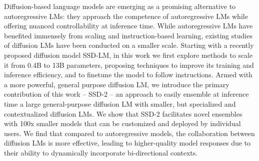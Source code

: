 Diffusion-based language models are emerging as a promising alternative to autoregressive LMs: they approach the competence of autoregressive LMs while offering nuanced controllability at inference time. While autoregressive LMs have benefited immensely from scaling and instruction-based learning, existing studies of diffusion LMs have been conducted on a smaller scale. Starting with a recently proposed diffusion model SSD-LM, in this work we first explore methods to scale it from 0.4B to 13B parameters, proposing techniques to improve its training and inference efficiency, and to finetune the model to follow instructions. Armed with a more powerful, general purpose diffusion LM, we introduce the primary contribution of this work -- SSD-2 -- an approach to easily ensemble at inference time a large general-purpose diffusion LM with smaller, but specialized and contextualized diffusion LMs. We show that SSD-2 facilitates novel ensembles with 100x smaller models that can be customized and deployed by individual users. We find that compared to autoregressive models, the collaboration between diffusion LMs is more effective, leading to higher-quality model responses due to their ability to dynamically incorporate bi-directional contexts.
